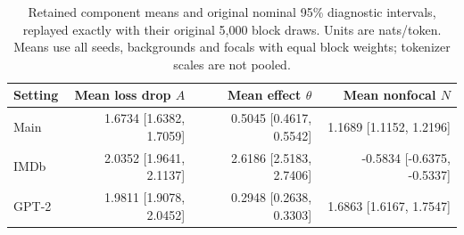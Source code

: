 \begin{table}[tp]
\centering
\footnotesize
\setlength{\tabcolsep}{3pt}
\begin{tabular}{lrrr}
\toprule
Setting & Mean loss drop $A$ & Mean effect $\theta$ & Mean nonfocal $N$ \\
\midrule
Main & 1.6734 [1.6382, 1.7059] & 0.5045 [0.4617, 0.5542] & 1.1689 [1.1152, 1.2196] \\
IMDb & 2.0352 [1.9641, 2.1137] & 2.6186 [2.5183, 2.7406] & -0.5834 [-0.6375, -0.5337] \\
GPT-2 & 1.9811 [1.9078, 2.0452] & 0.2948 [0.2638, 0.3303] & 1.6863 [1.6167, 1.7547] \\
\bottomrule
\end{tabular}
\caption{Retained component means and original nominal 95\% diagnostic intervals, replayed exactly with their original 5,000 block draws. Units are nats/token. Means use all seeds, backgrounds and focals with equal block weights; tokenizer scales are not pooled.}
\label{tab:review_component_means}
\end{table}
